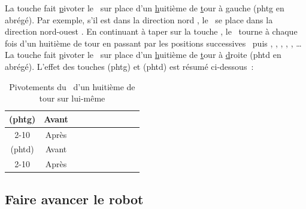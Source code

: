 La touche  fait \underline{p}ivoter le \robot\ sur place d'un 
\underline{h}uitième de \underline{t}our à \underline{g}auche ({\idt phtg} en abrégé).
Par exemple, s'il est dans la direction nord \robotCbN\/, le \robot\ se place dans la direction
nord-ouest \robotCbNW\/. En continuant à taper sur la touche , le \robot\
tourne à chaque fois d'un huitième de tour en passant par les positions successives
\robotCbW\ puis \robotCbSW\/, \robotCbS\/, \robotCbSE\/, \robotCbE\/, \robotCbNE\/, \ldots
La touche \touche{D} fait \underline{p}ivoter le \robot\ sur place d'un 
\underline{h}uitième de \underline{t}our à \underline{d}roite ({\idt phtd} en abrégé).
L'effet des touches  \touche{G} ({\idt phtg})  et \touche{D} ({\idt phtd}) est résumé 
\hbox{ci-dessous~:}
\begin{table}[htbp]
\begin{center}
\begin{tabular}{@{}|c|c|c|c|c|c|c|c|c|c|@{}} \hline
\touche{G} ({\idt phtg}) & Avant    & \robotCbN  & \robotCbNW & \robotCbW  & \robotCbSW & \robotCbS  & \robotCbSE & \robotCbE  & \robotCbNE \\ \cline{2-10}
                       & Après  & \robotCbNW & \robotCbW  & \robotCbSW & \robotCbS  & \robotCbSE &\robotCbE   & \robotCbNE & \robotCbN  \\ \hline \hline
\touche{D} ({\idt phtd}) & Avant    & \robotCbN  & \robotCbNE & \robotCbE  & \robotCbSE & \robotCbS  & \robotCbSW & \robotCbW  & \robotCbNW \\ \cline{2-10}
                       & Après & \robotCbNE & \robotCbE  & \robotCbSE & \robotCbS  & \robotCbSW & \robotCbW  & \robotCbNW & \robotCbN  \\ \hline
\end{tabular}
\end{center}
\caption{Pivotements du \protect\robot\ d'un huitième de tour sur lui-même}
\end{table}

\subsection{Faire avancer le robot}

